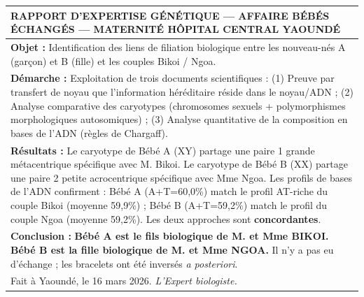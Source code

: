 \documentclass[11pt]{article}
\begin{document}
\begin{exoresolu}
\begin{center}
\begin{tabularx}{\linewidth}{|X|}\hline
\rowcolor{popblueL}
\textbf{RAPPORT D'EXPERTISE GÉNÉTIQUE — AFFAIRE BÉBÉS ÉCHANGÉS — MATERNITÉ HÔPITAL CENTRAL YAOUNDÉ} \\ \hline
\textbf{Objet :} Identification des liens de filiation biologique entre les nouveau-nés A (garçon) et B (fille) et les couples Bikoi / Ngoa. \\
\textbf{Démarche :} Exploitation de trois documents scientifiques : (1) Preuve par transfert de noyau que l'information héréditaire réside dans le noyau/ADN ; (2) Analyse comparative des caryotypes (chromosomes sexuels + polymorphismes morphologiques autosomiques) ; (3) Analyse quantitative de la composition en bases de l'ADN (règles de Chargaff). \\
\textbf{Résultats :} Le caryotype de Bébé A (XY) partage une paire 1 grande métacentrique spécifique avec M. Bikoi. Le caryotype de Bébé B (XX) partage une paire 2 petite acrocentrique spécifique avec Mme Ngoa. Les profils de bases de l'ADN confirment : Bébé A (A+T=60,0\%) match le profil AT-riche du couple Bikoi (moyenne 59,9\%) ; Bébé B (A+T=59,2\%) match le profil du couple Ngoa (moyenne 59,2\%). Les deux approches sont \textbf{concordantes}. \\
\textbf{Conclusion :} \textbf{Bébé A est le fils biologique de M. et Mme BIKOI. Bébé B est la fille biologique de M. et Mme NGOA.} Il n'y a pas eu d'échange ; les bracelets ont été inversés \emph{a posteriori}. \\
Fait à Yaoundé, le 16 mars 2026. \textit{L'Expert biologiste.} \\
\hline
\end{tabularx}
\end{center}
\end{exoresolu}
\end{document}
